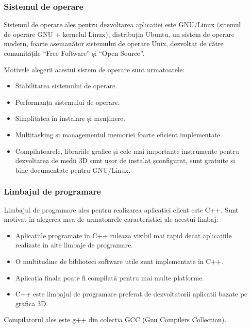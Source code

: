 \subsubsection{Sistemul de operare}
\par Sistemul de operare ales pentru dezvoltarea aplicatiei este GNU/Linux (sitemul de operare GNU + kernelul Linux), distribuția Ubuntu, un sistem de operare modern, foarte asemanător sistemului de operare Unix, dezvoltat de către comunitățile “Free Foftware” și “Open Source”.
\par Motivele alegerii acestui sistem de operare sunt urmatoarele: 
\begin{itemize}
\item Stabilitatea sistemului de operare. 
\item Performanța sistemului de operare. 
\item Simplitatea în instalare și menținere.  
\item Multitasking și managementul memoriei foarte eficient implementate.
\item Compilatoarele, librariile grafice și cele mai importante instrumente pentru dezvoltarea de medii 3D sunt ușor de instalat șconfigurat, sunt gratuite și bine documentate pentru GNU/Linux.
\end{itemize}

\subsubsection{Limbajul de programare}

\par Limbajul de programare ales pentru realizarea aplicației client este C++. Sunt motivat în alegerea mea de urmatoarele caracteristici ale acestui limbaj:  
\begin{itemize}
\item Aplicațiile programate în C++ ruleaza vizibil mai rapid decat aplicațiile realizate în alte limbaje de programare.
\item O multitudine de biblioteci software utile sunt implementate în C++.
\item Aplicația finala poate fi compilată pentru mai multe platforme.
\item C++ este limbajul de programare preferat de dezvoltatorii aplicatii bazate pe grafica 3D.
\end{itemize}
     
\par Compilatorul ales este g++ din colectia GCC (Gnu Compilers Collection). 

